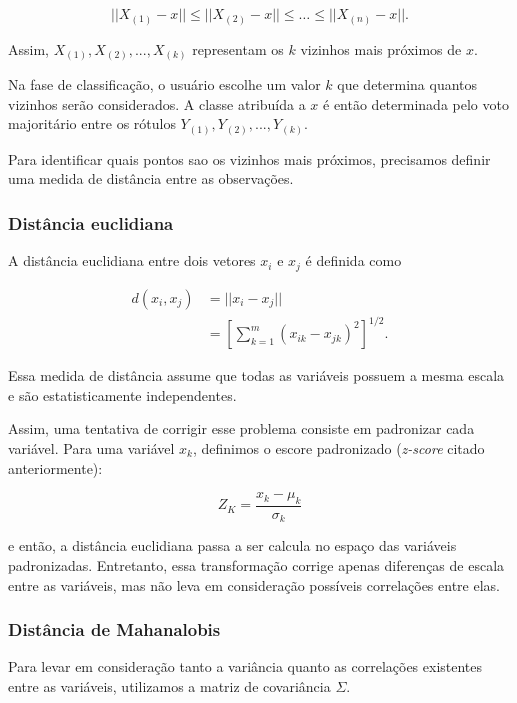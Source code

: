 \documentclass{article}
\begin{document}
\begin{equation}
    ||X_{(1)} - x|| \leq ||X_{(2)} - x|| \leq \dots \leq ||X_{(n)} - x||.
\end{equation}

Assim, $X_{(1)}, X_{(2)}, ..., X_{(k)}$ representam os $k$ vizinhos
mais próximos de $x$.

Na fase de classificação, o usuário escolhe um valor $k$ que determina 
quantos vizinhos serão considerados. A classe atribuída a $x$ é então
determinada pelo voto majoritário entre os rótulos 
$Y_{(1)}, Y_{(2)}, ..., Y_{(k)}$.

Para identificar quais pontos sao os vizinhos mais próximos,
precisamos definir uma medida de distância entre as observações.

\subsubsection{Distância euclidiana}

A distância euclidiana entre dois vetores $x_i$ e $x_j$ é definida como

\begin{align}
    d(x_i, x_j)
        &= ||x_i - x_j|| \\
        &= \left[\sum_{k=1}^{m}(x_{ik} - x_{jk})^2\right]^{1/2}.
\end{align}

Essa medida de distância assume que todas as variáveis possuem 
a mesma escala e são estatisticamente independentes.

Assim, uma tentativa de corrigir esse problema consiste em 
padronizar cada variável. Para uma variável $x_k$, definimos 
o escore padronizado (\textit{z-score} citado anteriormente):

\begin{equation*}
    Z_K = \frac{x_k - \mu_k}{\sigma_k}
\end{equation*}

e então, a distância euclidiana passa a ser calcula no 
espaço das variáveis padronizadas. Entretanto, essa 
transformação corrige apenas diferenças de escala entre as 
variáveis, mas não leva em consideração possíveis correlações 
entre elas.

\subsubsection{Distância de Mahanalobis}

Para levar em consideração tanto a variância quanto as correlações
existentes entre as variáveis, utilizamos a matriz de covariância 
$\Sigma$.
\end{document}
